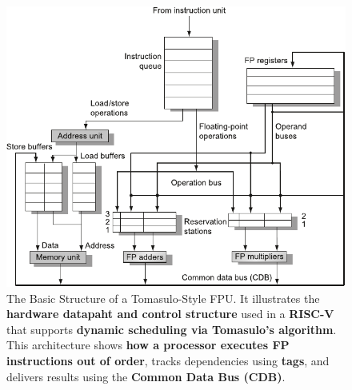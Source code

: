\begin{figure}[!htp]
    \centering
    \includegraphics[width=\textwidth]{img/tomasulo-fpu.pdf}
    \caption{The Basic Structure of a Tomasulo-Style FPU.\cite{hennessy2017computer} It illustrates the \textbf{hardware datapaht and control structure} used in a \textbf{RISC-V } that supports \textbf{dynamic scheduling via Tomasulo's algorithm}. This architecture shows \textbf{how a processor executes FP instructions out of order}, tracks dependencies using \textbf{tags}, and delivers results using the \textbf{Common Data Bus (CDB)}.}
    \label{fig: tomasulo fpu}
\end{figure}

